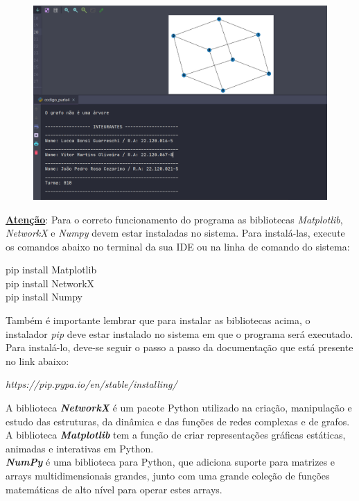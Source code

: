 \documentclass{article}
\begin{document}
 		\begin{figure}[H]
 			\centering
 			\includegraphics[width=0.6\linewidth]{"Figuras/saida"}
 			\label{fig:saida}
 			\caption{}
 		\end{figure}\vspace*{0.5cm}
 	
 		\textbf{\underline{Atenção}}: Para o correto funcionamento do programa as bibliotecas \textit{Matplotlib}, \textit{NetworkX} e \textit{Numpy} devem estar instaladas no sistema. Para instalá-las, execute os comandos abaixo no terminal da sua IDE ou na linha de comando do sistema:
 		
 		\begin{center}
 			pip install Matplotlib\\
 			pip install NetworkX\\
 			pip install Numpy
 		\end{center}
 		
 		Também é importante lembrar que para instalar as bibliotecas acima, o instalador \textit{pip} deve estar instalado no sistema em que o programa será executado. Para instalá-lo, deve-se seguir o passo a passo da documentação que está presente no link abaixo: 
 		\begin{center}
 			\textit{https://pip.pypa.io/en/stable/installing/}
 		\end{center}\vspace*{0.2cm}
 	
 			A biblioteca \textbf{\textit{NetworkX}} é um pacote Python utilizado na criação, manipulação e estudo das estruturas, da dinâmica e das funções de redes complexas e de grafos.\\
 		
 		A biblioteca \textbf{\textit{Matplotlib}} tem a função de criar representações gráficas estáticas, animadas e interativas em Python.\\
 		
 		\textbf{\textit{NumPy}} é uma biblioteca para Python, que adiciona suporte para matrizes e arrays multidimensionais grandes, junto com uma grande coleção de funções matemáticas de alto nível para operar estes arrays.
 		
\end{document}
